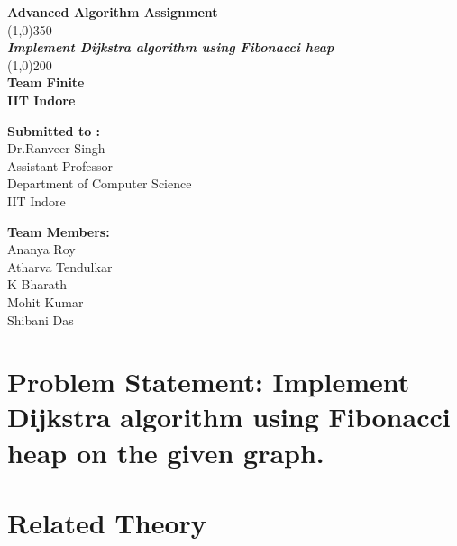 \documentclass{article}
\begin{document}
\begin{titlepage}

	\begin{center}
	
	\huge{\bfseries Advanced Algorithm Assignment}\\
	[1cm]
	\line(1,0){350}\\
	[0.15in]
	\textit{\huge{\bfseries{ Implement Dijkstra algorithm using Fibonacci heap}}}\\
	\line(1,0){200}\\
	[1cm]
	\textrm{\bfseries{\LARGE Team Finite}}\\
	[1cm]
	\textrm{\bfseries{\LARGE IIT Indore}}\\
	[8.2cm]
	\end{center}
	\begin{minipage}{0.25\linewidth}
	\begin{flushright}
	\textrm{\large
	{\bfseries Submitted to :}
	\\Dr.Ranveer Singh
	\\Assistant Professor
	\\Department of Computer Science
	\\IIT Indore
	}
	\end{flushright}
	\end{minipage}
	\hfill
	\begin{minipage}{0.25\linewidth}
	\begin{flushleft}
	\textrm{\large
	{\bfseries Team Members:}
	\\ Ananya Roy 
	\\Atharva Tendulkar
	\\K Bharath
	\\Mohit Kumar
	\\Shibani Das}
	\end{flushleft}
	\end{minipage}

\end{titlepage}

\tableofcontents
\thispagestyle{empty}
\cleardoublepage
\setcounter{page}{1}


\section*{Problem Statement: Implement Dijkstra algorithm using Fibonacci heap on the given graph.}\label{sec:spanning}
\section{Related Theory}
\end{document}
